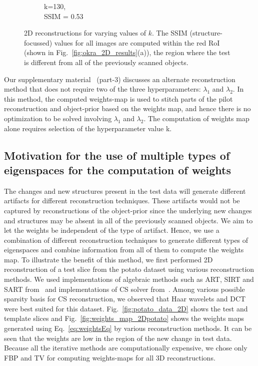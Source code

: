 \documentclass[journal]{IEEEtran}
\begin{document}
\begin{figure}[h]
\begin{subfigure}[b]{0.24\linewidth}
        \caption{k=130,\\ SSIM = 0.53}
     \end{subfigure}
    \caption{2D reconstructions for varying values of $k$. The SSIM (structure-focussed) values for all images are computed within the red RoI (shown in Fig.~\ref{fig:okra_2D_results}(a)), the region where the test is different from all of the previously scanned objects.}
\label{fig:reconstructions_as_k_varies}
\end{figure}

Our supplementary material~\cite{supp_paper} (part-3) discusses an alternate reconstruction method that does not require two of the three hyperparameters: $\lambda_1$ and $\lambda_2$. In this method, the computed weights-map is used to stitch parts of the pilot reconstruction and object-prior based on the weights map, and hence there is no optimization to be solved involving $\lambda_1$ and $\lambda_2$. The computation of weights map alone requires selection of the hyperparameter value k.


\subsection{Motivation for the use of multiple types of eigenspaces for the computation of weights}

The changes and new structures present in the test data will generate
different artifacts for different reconstruction techniques. These
artifacts would not be captured by reconstructions of the object-prior
since the underlying new changes and structures may be absent in all
of the previously scanned objects. We aim to let the weights be
independent of the type of artifact. Hence, we use a combination of
different reconstruction techniques to generate different types of
eigenspaces and combine information from all of them to compute the
weights map. To illustrate the benefit of this method, we first performed
2D reconstruction of a test slice from the potato dataset using
various reconstruction methods. We used implementations of algebraic
methods such as ART, SIRT and SART from~\cite{AIR_tools} and
implementations of CS solver from~\cite{l1ls}. Among various possible
sparsity basis for CS reconstruction, we observed that Haar wavelets
and DCT were best suited for this
dataset. Fig.~\ref{fig:potato_data_2D} shows the test and template
slices and Fig.~\ref{fig:weights_map_2Dpotato} shows the weights maps
generated using Eq.~\ref{eq:weightsEq} by various reconstruction
methods. It can be seen that the weights are low in the region of the
new change in test data. Because all the iterative methods are
computationally expensive, we chose only FBP and TV for computing
weights-maps for all 3D reconstructions.
\end{document}
